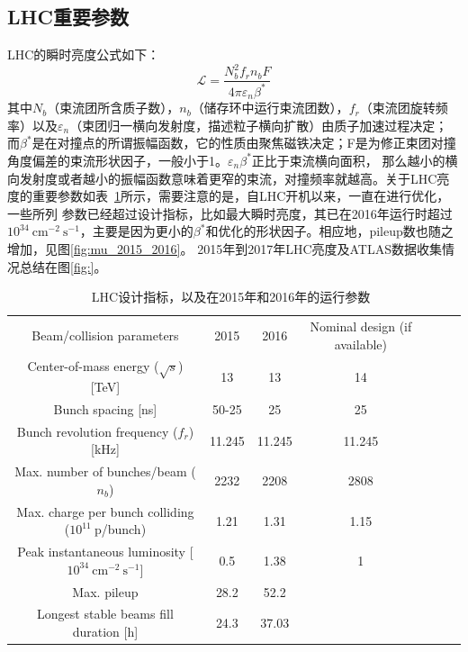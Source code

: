 \subsection{LHC重要参数}
LHC的瞬时亮度公式如下：
\begin{equation}
\mathcal{L}=\frac{N_{b}^{2}f_{r}n_{b}F}{4\pi\varepsilon_{n}\beta^{*}}
\end{equation}
其中$N_b$（束流团所含质子数），$n_b$（储存环中运行束流团数），$f_{r}$（束流团旋转频率）以及$\varepsilon_n$（束团归一横向发射度，描述粒子横向扩散）由质子加速过程决定；
而$\beta^{*}$是在对撞点的所谓振幅函数，它的性质由聚焦磁铁决定；F是为修正束团对撞角度偏差的束流形状因子，一般小于1。$\varepsilon_{n}\beta^{*}$正比于束流横向面积，
那么越小的横向发射度或者越小的振幅函数意味着更窄的束流，对撞频率就越高。关于LHC亮度的重要参数如表~\ref{tab:lhc_run_summary}所示，需要注意的是，自LHC开机以来，一直在进行优化，一些所列
参数已经超过设计指标，比如最大瞬时亮度，其已在2016年运行时超过$10^{34}~\text{cm}^{-2}~\text{s}^{-1}$，主要是因为更小的$\beta^{*}$和优化的形状因子。相应地，pileup数也随之增加，见图\ref{fig:mu_2015_2016}。
2015年到2017年LHC亮度及ATLAS数据收集情况总结在图\ref{fig:}。
\begin{table}[h]
\centering
\begin{tabular}{ccccccc}
\hline
Beam/collision parameters    &2015       &2016  &Nominal design (if available)\\
Center-of-mass energy ($\sqrt{s}$) [TeV]     &13   &13    &14 \\
Bunch spacing [ns]   &50-25   &25    &25 \\
Bunch revolution frequency ($f_{r}$) [kHz]  &11.245  &11.245  &11.245 \\
Max. number of bunches/beam ($n_{b}$)   &2232    &2208    &2808  \\
Max. charge per bunch colliding ($10^{11}~$p/bunch) &1.21   &1.31   &1.15 \\
Peak instantaneous luminosity [$10^{34}~\text{cm}^{-2}~\text{s}^{-1}$]  &0.5  &1.38  &1  \\
Max. pileup  &28.2   &52.2   & \\
Longest stable beams fill duration [h]  &24.3 &37.03  & \\
\hline
\end{tabular}
\caption{LHC设计指标，以及在2015年和2016年的运行参数~\cite{LHC-Run-Summary}}
\label{tab:lhc_run_summary}
\end{table}

